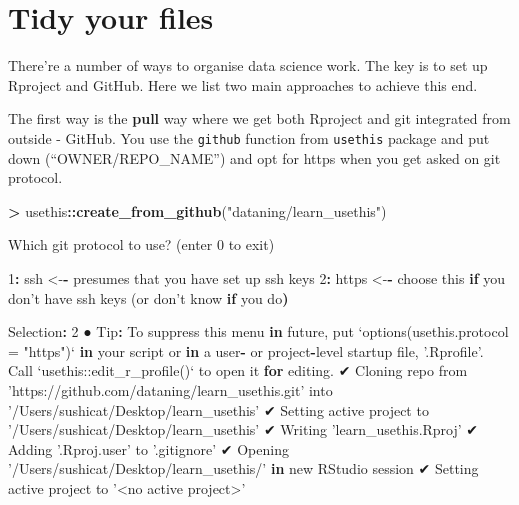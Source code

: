 \documentclass[]{book}
\newenvironment{Shaded}{\begin{snugshade}}{\end{snugshade}}
\newcommand{\ControlFlowTok}[1]{\textcolor[rgb]{0.13,0.29,0.53}{\textbf{#1}}}
\newcommand{\DataTypeTok}[1]{\textcolor[rgb]{0.13,0.29,0.53}{#1}}
\newcommand{\DecValTok}[1]{\textcolor[rgb]{0.00,0.00,0.81}{#1}}
\newcommand{\ErrorTok}[1]{\textcolor[rgb]{0.64,0.00,0.00}{\textbf{#1}}}
\newcommand{\KeywordTok}[1]{\textcolor[rgb]{0.13,0.29,0.53}{\textbf{#1}}}
\newcommand{\NormalTok}[1]{#1}
\newcommand{\OperatorTok}[1]{\textcolor[rgb]{0.81,0.36,0.00}{\textbf{#1}}}
\newcommand{\StringTok}[1]{\textcolor[rgb]{0.31,0.60,0.02}{#1}}
\begin{document}
\hypertarget{tidy-your-files}{%
\section{Tidy your files}\label{tidy-your-files}}

There're a number of ways to organise data science work. The key is to set up Rproject and GitHub. Here we list two main approaches to achieve this end.

The first way is the \textbf{pull} way where we get both Rproject and git integrated from outside - GitHub. You use the \texttt{github} function from \texttt{usethis} package and put down (``OWNER/REPO\_NAME'') and opt for https when you get asked on git protocol.

\begin{Shaded}
\begin{Highlighting}[]
\OperatorTok{>}\StringTok{ }\NormalTok{usethis}\OperatorTok{::}\KeywordTok{create_from_github}\NormalTok{(}\StringTok{"dataning/learn_usethis"}\NormalTok{)}

\NormalTok{Which git protocol to use? (enter }\DecValTok{0}\NormalTok{ to exit) }

\DecValTok{1}\OperatorTok{:}\StringTok{ }\NormalTok{ssh   <-}\OperatorTok{-}\StringTok{ }\NormalTok{presumes that you have set up ssh keys}
\DecValTok{2}\OperatorTok{:}\StringTok{ }\NormalTok{https <-}\OperatorTok{-}\StringTok{ }\NormalTok{choose this }\ControlFlowTok{if}\NormalTok{ you don}\StringTok{'t have ssh keys (or don'}\NormalTok{t know }\ControlFlowTok{if}\NormalTok{ you do}\ErrorTok{)}

\NormalTok{Selection}\OperatorTok{:}\StringTok{ }\DecValTok{2}
\NormalTok{● Tip}\OperatorTok{:}\StringTok{ }\NormalTok{To suppress this menu }\ControlFlowTok{in}\NormalTok{ future, put}
  \StringTok{`}\DataTypeTok{options(usethis.protocol = "https")}\StringTok{`}
  \ControlFlowTok{in}\NormalTok{ your script or }\ControlFlowTok{in}\NormalTok{ a user}\OperatorTok{-}\StringTok{ }\NormalTok{or project}\OperatorTok{-}\NormalTok{level startup file, }\StringTok{'.Rprofile'}\NormalTok{.}
\NormalTok{  Call }\StringTok{`}\DataTypeTok{usethis::edit_r_profile()}\StringTok{`}\NormalTok{ to open it }\ControlFlowTok{for}\NormalTok{ editing.}
\NormalTok{✔ Cloning repo from }\StringTok{'https://github.com/dataning/learn_usethis.git'}\NormalTok{ into }\StringTok{'/Users/sushicat/Desktop/learn_usethis'}
\NormalTok{✔ Setting active project to }\StringTok{'/Users/sushicat/Desktop/learn_usethis'}
\NormalTok{✔ Writing }\StringTok{'learn_usethis.Rproj'}
\NormalTok{✔ Adding }\StringTok{'.Rproj.user'}\NormalTok{ to }\StringTok{'.gitignore'}
\NormalTok{✔ Opening }\StringTok{'/Users/sushicat/Desktop/learn_usethis/'} \ControlFlowTok{in}\NormalTok{ new RStudio session}
\NormalTok{✔ Setting active project to }\StringTok{'<no active project>'}
\end{Highlighting}
\end{Shaded}
\end{document}
